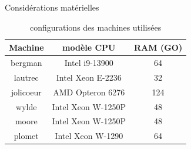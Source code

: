 \documentclass{backend/backend}
\begin{document}
\begin{frame}{Considérations matérielles} \label{annexe:machines}

\begin{center}
    \begin{table}[ht]
        \centering
        \caption{configurations des machines utilisées}
        \label{tab:configurations}
        \begin{tabular}{|c|c|c|}
            \toprule
            Machine & modèle CPU & RAM (GO) \\
            \midrule
                \makeatletter\def\@currentlabel{bergman}\makeatother
                bergman\label{bergman}  & Intel i9-13900 & 64 \\
                \makeatletter\def\@currentlabel{lautrec}\makeatother
                lautrec\label{lautrec}  & Intel Xeon E-2236 & 32 \\
                \makeatletter\def\@currentlabel{jolicoeur}\makeatother
                jolicoeur\label{jolicoeur} & AMD Opteron 6276 & 124 \\
                \makeatletter\def\@currentlabel{wylde}\makeatother
                wylde\label{wylde} & Intel Xeon W-1250P & 48 \\
                \makeatletter\def\@currentlabel{moore}\makeatother
                moore\label{moore} & Intel Xeon W-1250P & 48 \\
                \makeatletter\def\@currentlabel{plomet}\makeatother
                plomet\label{plomet}  & Intel Xeon W-1290 & 64 \\
            \bottomrule
        \end{tabular}
    \end{table}
\end{center}


\end{frame}
\end{document}
